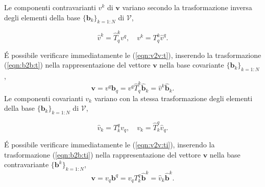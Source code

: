  \noindent
 Le componenti contravarianti $v^k$ di $\bm{v}$ variano secondo la trasformazione inversa degli elementi della base $\{ \bm{b}_k \}_{k=1:N}$ di $\mathcal{V}$,
\begin{fBox}
\begin{equation}\label{eqn:v2v:t}
 \hat{v}^k = \hat{T}^k_q v^q , \quad v^k = T^k_q \hat{v}^q .
\end{equation}
\end{fBox}
\'E possibile verificare immediatamente le (\ref{eqn:v2v:t}), inserendo la trasformazione (\ref{eqn:b2b:t}) nella rappresentazione del vettore $\bm{v}$ nella base covariante $\{ \bm{b}_k \}_{k=1:N}$,
 \begin{equation}
  \bm{v} = v^q \bm{b}_q = v^q \hat{T}^k_q \bm{\hat{b}}_k = \hat{v}^k \bm{\hat{b}}_k .
 \end{equation}
 Le componenti covarianti $v_k$ variano con la stessa trasformazione
  degli elementi  della base
 $\{ \bm{b}_k \}_{k=1:N}$ di $\mathcal{V}$,
 \begin{fBox}
 \begin{equation}\label{eqn:v2v:ti}
  \hat{v}_k = T^q_k v_q , \quad v_k = \hat{T}^q_k \hat{v}_q .
 \end{equation}
 \end{fBox}
 \'E possibile verificare immediatamente le (\ref{eqn:v2v:ti}), inserendo la trasformazione (\ref{eqn:b2b:ti}) nella rappresentazione del vettore $\bm{v}$ nella base contravariante $\{ \bm{b}^k \}_{k=1:N}$,
  \begin{equation}
  \bm{v} = v_q \bm{b}^q = v_q T^q_k \bm{\hat{b}}^k = \hat{v}_k \bm{\hat{b}}^k .
  \end{equation}
% 
%
\vspace{30pt}
\noindent
